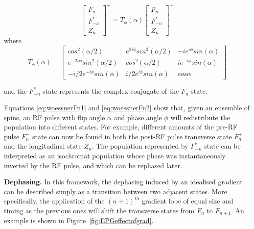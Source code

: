 \begin{equation}\label{eq:woessnerFn1}
    \begin{bmatrix}
        F_n      \\
        F_{-n}^* \\
        Z_n
    \end{bmatrix}^+ = 
    T_{\phi}(\alpha)
    \begin{bmatrix}
        F_n      \\
        F_{-n}^* \\
        Z_n
    \end{bmatrix}^- 
\end{equation}
where
\begin{equation}\label{eq:woessnerFn2}
    T_{\phi}(\alpha) = 
    \begin{bmatrix}
        cos^2(\alpha/2) & e^{2i\phi} sin^2(\alpha/2) & - i e^{i \phi} sin(\alpha) \\
        e^{-2i\phi} sin^2(\alpha/2) & cos^2(\alpha/2) & i e^{-i \phi} sin(\alpha) \\
        - i/2 e^{-i \phi} sin(\alpha) & i/2 e^{i \phi} sin(\alpha) & cos \alpha
    \end{bmatrix}
\end{equation}

and the $F^*_{-n}$ state represents the complex conjugate of the $F_n$ state.

\hfill

Equations \ref{eq:woessnerFn1} and \ref{eq:woessnerFn2} show that, given an ensemble of spins, an RF pulse with flip angle $\alpha$ and phase angle $\phi$ will redistribute the population into different states.
For example, different amounts of the pre-RF pulse $F^-_n$ state can now be found in both the post-RF pulse transverse state $F^+_n$ and the longitudinal state $Z_n$.
The population represented by $F^*_{-n}$ state can be interpreted as an isochromat population whose phase was instantaneously inverted by the RF pulse, and which can be rephased later.

\hfill

\textbf{Dephasing. } In this framework, the dephasing induced by an idealised gradient can be described simply as a transition between two adjacent states.
More specifically, the application of the $(n+1)^{th}$ gradient lobe of equal size and timing as the previous ones will shift the transverse states from $F_n$ to $F_{n+1}$.
An example is shown in Figure~\ref{fig:EPGeffectofgrad}.

\hfill

